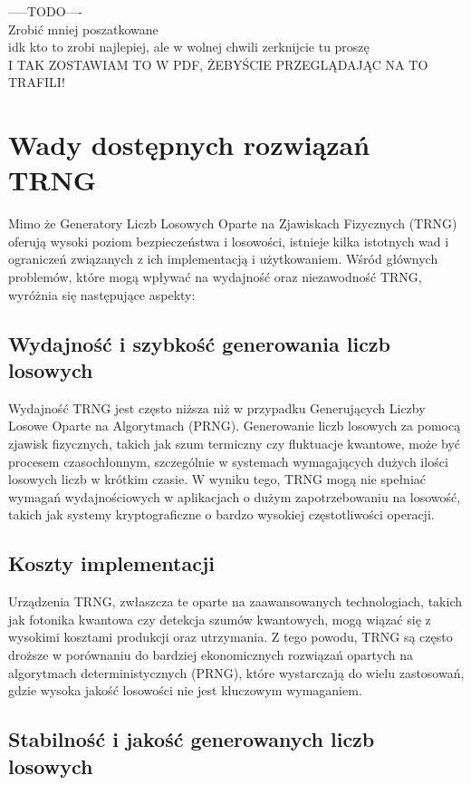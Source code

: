         -----TODO---- \\
    Zrobić mniej poszatkowane \\
    idk kto to zrobi najlepiej, ale w wolnej chwili zerknijcie tu proszę \\
    I TAK ZOSTAWIAM TO W PDF, ŻEBYŚCIE PRZEGLĄDAJĄC NA TO TRAFILI! \\


\section{Wady dostępnych rozwiązań TRNG}

Mimo że Generatory Liczb Losowych Oparte na Zjawiskach Fizycznych (TRNG) oferują wysoki poziom bezpieczeństwa i losowości, istnieje kilka istotnych wad i ograniczeń związanych z ich implementacją i użytkowaniem. Wśród głównych problemów, które mogą wpływać na wydajność oraz niezawodność TRNG, wyróżnia się następujące aspekty:

\subsection{Wydajność i szybkość generowania liczb losowych}

Wydajność TRNG jest często niższa niż w przypadku Generujących Liczby Losowe Oparte na Algorytmach (PRNG). Generowanie liczb losowych za pomocą zjawisk fizycznych, takich jak szum termiczny czy fluktuacje kwantowe, może być procesem czasochłonnym, szczególnie w systemach wymagających dużych ilości losowych liczb w krótkim czasie. W wyniku tego, TRNG mogą nie spełniać wymagań wydajnościowych w aplikacjach o dużym zapotrzebowaniu na losowość, takich jak systemy kryptograficzne o bardzo wysokiej częstotliwości operacji.

\subsection{Koszty implementacji}

Urządzenia TRNG, zwłaszcza te oparte na zaawansowanych technologiach, takich jak fotonika kwantowa czy detekcja szumów kwantowych, mogą wiązać się z wysokimi kosztami produkcji oraz utrzymania. Z tego powodu, TRNG są często droższe w porównaniu do bardziej ekonomicznych rozwiązań opartych na algorytmach deterministycznych (PRNG), które wystarczają do wielu zastosowań, gdzie wysoka jakość losowości nie jest kluczowym wymaganiem.

\subsection{Stabilność i jakość generowanych liczb losowych}


